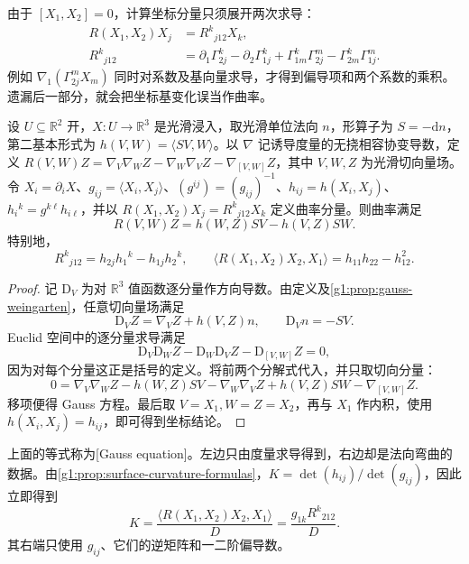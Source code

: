 由于 \([X_1,X_2]=0\)，计算坐标分量只须展开两次求导：
\begin{equation}
	\label{g1:eq:surface-curvature-components}
	\begin{aligned}
		R(X_1,X_2)X_j&=R^k{}_{j12}X_k,\\
		R^k{}_{j12}
		&=\partial_1\Gamma^k_{2j}-\partial_2\Gamma^k_{1j}
		+\Gamma^k_{1m}\Gamma^m_{2j}-\Gamma^k_{2m}\Gamma^m_{1j}.
	\end{aligned}
\end{equation}
例如 \(\nabla_1(\Gamma^m_{2j}X_m)\) 同时对系数及基向量求导，才得到偏导项和两个系数的乘积。遗漏后一部分，就会把坐标基变化误当作曲率。

\begin{theorem}[Gauss 方程]
	\label{g1:thm:gauss-equation}
	设 \(U\subseteq\mathbb R^2\) 开，\(X:U\rightarrow\mathbb R^3\) 是光滑浸入，取光滑单位法向 \(n\)，形算子为 \(S=-\mathrm{d}n\)，第二基本形式为 \(h(V,W)=\langle SV,W\rangle\)。以 \(\nabla\) 记诱导度量的无挠相容协变导数，定义 \(R(V,W)Z=\nabla_V\nabla_WZ-\nabla_W\nabla_VZ-\nabla_{[V,W]}Z\)，其中 \(V,W,Z\) 为光滑切向量场。令 \(X_i=\partial_iX\)、\(g_{ij}=\langle X_i,X_j\rangle\)、\((g^{ij})=(g_{ij})^{-1}\)、\(h_{ij}=h(X_i,X_j)\)、\(h_i{}^k=g^{k\ell}h_{i\ell}\)，并以 \(R(X_1,X_2)X_j=R^k{}_{j12}X_k\) 定义曲率分量。则曲率满足
	\begin{equation}
		\label{g1:eq:gauss-equation}
		R(V,W)Z=h(W,Z)SV-h(V,Z)SW.
	\end{equation}
	特别地，
	\[
		R^k{}_{j12}=h_{2j}h_1{}^k-h_{1j}h_2{}^k,\qquad
		\langle R(X_1,X_2)X_2,X_1\rangle=h_{11}h_{22}-h_{12}^2.
	\]
\end{theorem}

\begin{proof}
	记 \(\mathrm{D}_V\) 为对 \(\mathbb R^3\) 值函数逐分量作方向导数。由定义及\cref{g1:prop:gauss-weingarten}，任意切向量场满足
	\[
		\mathrm{D}_VZ=\nabla_VZ+h(V,Z)n,\qquad \mathrm{D}_Vn=-SV.
	\]
	Euclid 空间中的逐分量求导满足
	\[
		\mathrm{D}_V\mathrm{D}_WZ-\mathrm{D}_W\mathrm{D}_VZ-\mathrm{D}_{[V,W]}Z=0,
	\]
	因为对每个分量这正是括号的定义。将前两个分解式代入，并只取切向分量：
	\[
		0=\nabla_V\nabla_WZ-h(W,Z)SV
		-\nabla_W\nabla_VZ+h(V,Z)SW-\nabla_{[V,W]}Z.
	\]
	移项便得 Gauss 方程。最后取 \(V=X_1,W=Z=X_2\)，再与 \(X_1\) 作内积，使用 \(h(X_i,X_j)=h_{ij}\)，即可得到坐标结论。
\end{proof}

上面的等式称为[Gauss equation]。左边只由度量求导得到，右边却是法向弯曲的数据。由\cref{g1:prop:surface-curvature-formulas}，\(K=\det(h_{ij})/\det(g_{ij})\)，因此立即得到
\begin{equation}
	\label{g1:eq:intrinsic-gauss-curvature}
	K=\frac{\langle R(X_1,X_2)X_2,X_1\rangle}{D}
	=\frac{g_{1k}R^k{}_{212}}{D}.
\end{equation}
其右端只使用 \(g_{ij}\)、它们的逆矩阵和一二阶偏导数。

